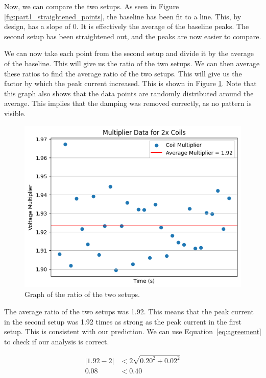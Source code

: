 \documentclass[11pt]{article}
\begin{document}
    Now, we can compare the two setups.
    As seen in Figure \ref{fig:part1_straightened_points}, the baseline has been fit to a line.
    This, by design, has a slope of 0.
    It is effectively the average of the baseline peaks.
    The second setup has been straightened out, and the peaks are now easier to compare.

    We can now take each point from the second setup and divide it by the average of the baseline.
    This will give us the ratio of the two setups.
    We can then average these ratios to find the average ratio of the two setups.
    This will give us the factor by which the peak current increased.
    This is shown in Figure \ref{fig:part1a_ratios}.
    Note that this graph also shows that the data points are randomly distributed around the average.
    This implies that the damping was removed correctly, as no pattern is visible.

    \begin{figure}[H]
        \centering
        \includegraphics[width=0.8\linewidth]{resources/images/part1a ratios}
        \caption{Graph of the ratio of the two setups.}
        \label{fig:part1a_ratios}
    \end{figure}

    The average ratio of the two setups was 1.92.
    This means that the peak current in the second setup was 1.92 times as strong as the peak current in the first setup.
    This is consistent with our prediction.
    We can use Equation~\ref{eq:agreement} to check if our analysis is correct.

    \begin{align*}
        |1.92 - 2| &< 2 \sqrt{0.20^2 + 0.02^2} \\
        0.08 &< 0.40
    \end{align*}
\end{document}
